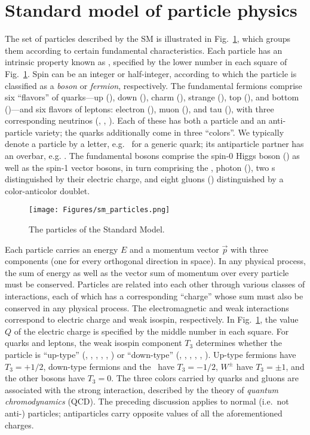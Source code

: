 \section{Standard model of particle physics} \label{sec:introduction_standard_model}
The set of particles described by the SM is illustrated in Fig.~\ref{fig:sm_particles}, which
groups them according to certain fundamental characteristics.
Each particle has an intrinsic property known as , specified by the lower number in each square of Fig.~\ref{fig:sm_particles}.
Spin can be an integer or half-integer, according to which the particle is classified as a \textit{boson} or \textit{fermion}, respectively.
The fundamental fermions comprise six ``flavors'' of quarks---up (\Pu), down (\Pd), charm (\Pc), strange (\Ps), top (\Pt), and bottom (\Pb)---and six flavors of
leptons: electron (\Pe), muon (\Pmu), and tau (\Ptau), with three corresponding neutrinos (\Pne, \Pnmu, \Pntau).
Each of these has both a particle and an anti-particle variety; the quarks additionally come in three ``colors''.
We typically denote a particle by a letter, e.g. \Pq\ for a generic quark; its antiparticle partner has an overbar, e.g. \Paq.
The fundamental bosons comprise the spin-0 Higgs boson (\PH) as well as the spin-1 vector bosons, in turn comprising the \PZ, photon (\Pgamma),
two \PW s distinguished by their electric charge, and eight gluons (\Pg) distinguished by a color-anticolor doublet.

\begin{figure}[hbtp]
  \begin{center}
    \texttt{[image: Figures/sm\_particles.png]}
    \caption{
      The particles of the Standard Model.
    }
    \label{fig:sm_particles}
  \end{center}
\end{figure}

Each particle carries an energy $E$ and a momentum vector $\vec{p}$ with three components (one for every orthogonal direction in space).
In any physical process, the sum of energy as well as the vector sum of momentum over every particle must be conserved.
Particles are related into each other through various
classes of interactions, each of which has a corresponding ``charge'' whose sum must also be conserved in any physical process.
The electromagnetic and weak interactions correspond to electric charge and weak isospin, respectively.
In Fig.~\ref{fig:sm_particles}, the value $Q$ of the electric charge is specified by the middle number in each square.
For quarks and leptons, the weak isospin component $T_{3}$ determines whether the particle is ``up-type''
(\Pu, \Pd, \Pt, \Pne, \Pnmu, \Pntau) or ``down-type'' (\Pd, \Ps, \Pb, \Pe, \Pmu, \Ptau).
Up-type fermions have $T_{3} = \mathrm{+}1/2$, down-type fermions and the \PH\ have
$T_{3} = \mathrm{-}1/2$, $W^\pm$ have $T_{3} = \pm1$, and the other bosons have $T_{3} = 0$.
The three colors carried by quarks and gluons are associated with the strong interaction, described by the theory of \textit{quantum
chromodynamics} (QCD). The preceding discussion applies to normal (i.e.\ not anti-) particles; antiparticles carry opposite values of all the
aforementioned charges.

